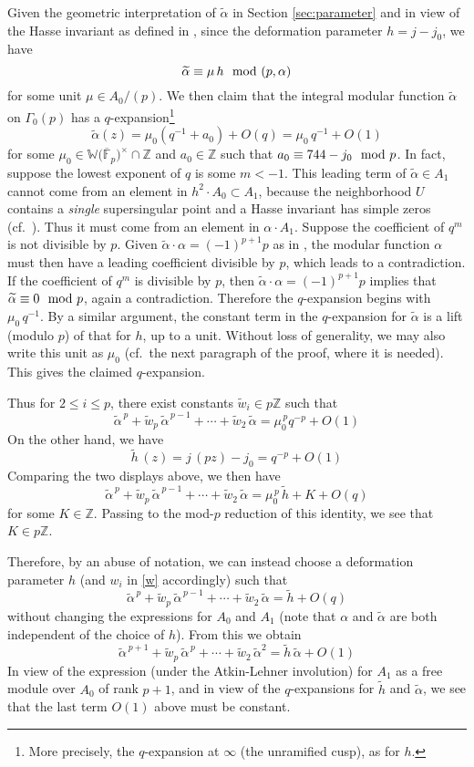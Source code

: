 \documentclass{gtpart}
\theoremstyle{definition}
\theoremstyle{remark}
\newcommand{\mb}[1]{\mathbb{#1}}
\newcommand{\cF}{\overline {\mb F}}
\newcommand{\BW}{{\mb W}}
\newcommand{\BZ}{{\mb Z}}
\newcommand{\tA}{\widetilde{\A}}
\renewcommand{\th}{\widetilde{h}}
\newcommand{\tw}{\widetilde{w}}
\newcommand{\md}{~~{\rm mod}~}
\newcommand{\A}{\alpha}
\newcommand{\G}{\Gamma}
\renewcommand{\=}{\approx}
\renewcommand{\-}{\sim}
\numberwithin{equation}{section}
\begin{document}
Given the geometric interpretation of $\tA$ in Section \ref{sec:parameter} and 
in view of the Hasse invariant as defined in \cite[12.4.1]{KM}, since the 
deformation parameter $h = j - j_0$, we have 
\[
 \tA \equiv \mu \, h \md (p,\A) 
\]
for some unit $\mu \in A_0/(p)$.  We then claim that the integral modular 
function $\tA$ on $\G_0(p)$ has a $q$-expansion\footnote{More precisely, the 
$q$-expansion at $\infty$ (the unramified cusp), as for $h$.  } 
\[
 \tA(z) = \mu_0 (q^{-1} + a_0) + O(q) = \mu_0 \, q^{-1} + O(1) 
\]
for some $\mu_0 \in \BW\big(\cF_p\big)^{\!\times} \!\cap \BZ$ and $a_0 \in \BZ$ 
such that $a_0 \equiv 744 - j_0 \md p$.  In fact, suppose the lowest exponent of 
$q$ is some $m < -1$.  This leading term of $\tA \in A_1$ cannot come from an 
element in $h^2 \cdot A_0 \subset A_1$, because the neighborhood $U$ contains a 
{\em single} supersingular point and a Hasse invariant has simple zeros 
(cf.~\cite[Theorem 12.4.3]{KM}).  Thus it must come from an element in 
$\A \cdot A_1$.  Suppose the coefficient of $q^m$ is not divisible by $p$.  
Given $\tA \cdot \A = (-1)^{p + 1} p$ as in \cite[(3.30)]{ho}, the modular 
function $\A$ must then have a leading coefficient divisible by $p$, which leads 
to a contradiction.  If the coefficient of $q^m$ is divisible by $p$, then 
$\tA \cdot \A = (-1)^{p + 1} p$ implies that $\tA \equiv 0 \md p$, again a 
contradiction.  Therefore the $q$-expansion begins with $\mu_0 \, q^{-1}$.  By a 
similar argument, the constant term in the $q$-expansion for $\tA$ is a lift 
(modulo $p$) of that for $h$, up to a unit.  Without loss of generality, we may 
also write this unit as $\mu_0$ (cf.~the next paragraph of the proof, where it 
is needed).  This gives the claimed $q$-expansion.  

Thus for $2 \leq i \leq p$, there exist constants $\tw_i \in p\BZ$ such that 
\[
 \tA^{\,p} + \tw_p \, \tA^{\,p - 1} + \cdots + \tw_2 \, \tA = \mu_0^{\,p} q^{-p} 
 + O(1) 
\]
On the other hand, we have 
\[
 \th\,(z) = j\,(p z) - j_0 = q^{-p} + O(1) 
\]
Comparing the two displays above, we then have 
\[
 \tA^{\,p} + \tw_p \, \tA^{\,p - 1} + \cdots + \tw_2 \, \tA = \mu_0^{\,p} \, \th 
 + K + O(q) 
\]
for some $K \in \BZ$.  Passing to the mod-$p$ reduction of this identity, we see 
that $K \in p\BZ$.  

Therefore, by an abuse of notation, we can instead choose a deformation 
parameter $h$ (and $w_i$ in \eqref{w} accordingly) such that 
\[
 \tA^{\,p} + \tw_p \, \tA^{\,p - 1} + \cdots + \tw_2 \, \tA = \th + O(q) 
\]
without changing the expressions for $A_0$ and $A_1$ (note that $\A$ and $\tA$ 
are both independent of the choice of $h$).  From this we obtain 
\[
 \tA^{\,p + 1} + \tw_p \, \tA^{\,p} + \cdots + \tw_2 \, \tA^2 = \th \, \tA 
 + O(1) 
\]
In view of the expression (under the Atkin-Lehner involution) for $A_1$ as a 
free module over $A_0$ of rank $p + 1$, and in view of the $q$-expansions for 
$\th$ and $\tA$, we see that the last term $O(1)$ above must be constant.  
\end{document}
